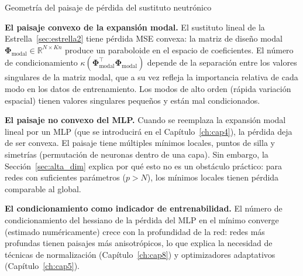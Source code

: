 
\begin{estrella}{Geometría del paisaje de pérdida del sustituto neutrónico}
\label{sec:estrella3}

\textbf{El paisaje convexo de la expansión modal.}
El sustituto lineal de la Estrella~\ref{sec:estrella2} tiene pérdida
MSE convexa: la matriz de diseño modal
$\bm{\Phi}_{\text{modal}} \in \mathbb{R}^{N \times Kn}$ produce un
paraboloide en el espacio de coeficientes. El número de condicionamiento
$\kappa(\bm{\Phi}_{\text{modal}}^\top\bm{\Phi}_{\text{modal}})$ depende
de la separación entre los valores singulares de la matriz modal, que a
su vez refleja la importancia relativa de cada modo en los datos de
entrenamiento. Los modos de alto orden (rápida variación espacial)
tienen valores singulares pequeños y están mal condicionados.

\textbf{El paisaje no convexo del MLP.}
Cuando se reemplaza la expansión modal lineal por un MLP (que se
introducirá en el Capítulo~\ref{ch:cap4}), la pérdida deja de ser
convexa. El paisaje tiene múltiples mínimos locales, puntos de silla y
simetrías (permutación de neuronas dentro de una capa). Sin embargo, la
Sección~\ref{sec:alta_dim} explica por qué esto no es un obstáculo
práctico: para redes con suficientes parámetros ($p > N$), los mínimos
locales tienen pérdida comparable al global.

\textbf{El condicionamiento como indicador de entrenabilidad.}
El número de condicionamiento del hessiano de la pérdida del MLP en el
mínimo converge (estimado numéricamente) crece con la profundidad de la
red: redes más profundas tienen paisajes más anisotrópicos, lo que
explica la necesidad de técnicas de normalización
(Capítulo~\ref{ch:cap8}) y optimizadores adaptativos
(Capítulo~\ref{ch:cap5}).
\end{estrella}

\printbibliography[heading=subbibliography]